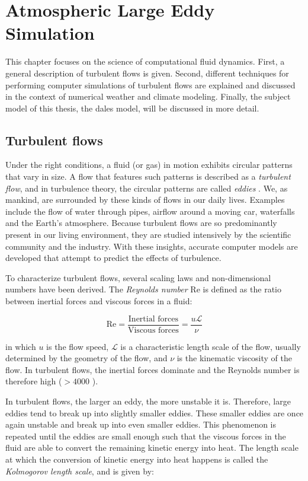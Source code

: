 \chapter{Atmospheric Large Eddy Simulation} \label{chap:les}
This chapter focuses on the science of computational fluid dynamics. First, a general description of turbulent flows is given. Second, different techniques for performing computer simulations of turbulent flows are explained and discussed in the context of numerical weather and climate modeling. Finally, the subject model of this thesis, the \acrfull{dales} model, will be discussed in more detail.

\section{Turbulent flows}
Under the right conditions, a fluid (or gas) in motion exhibits circular patterns that vary in size. A flow that features such patterns is described as a \emph{turbulent flow}, and in turbulence theory, the circular patterns are called \emph{eddies} \citep{popeTurbulentFlows2000}. We, as mankind, are surrounded by these kinds of flows in our daily lives. Examples include the flow of water through pipes, airflow around a moving car, waterfalls and the Earth's atmosphere. Because turbulent flows are so predominantly present in our living environment, they are studied intensively by the scientific community and the industry. With these insights, accurate computer models are developed that attempt to predict the effects of turbulence.

To characterize turbulent flows, several scaling laws and non-dimensional numbers have been derived. The \emph{Reynolds number} $\text{Re}$ is defined as the ratio between inertial forces and viscous forces in a fluid: 

\begin{equation}
    \text{Re} = \frac{\text{Inertial forces}}{\text{Viscous forces}} = \frac{u \mathcal{L}}{\nu}
    \label{eq:reynolds_number}
\end{equation}

in which $u$ is the flow speed, $\mathcal{L}$ is a characteristic length scale of the flow, usually determined by the geometry of the flow, and $\nu$ is the kinematic viscosity of the flow. In turbulent flows, the inertial forces dominate and the Reynolds number is therefore high ($>4000$ \citep{popeTurbulentFlows2000}). 

In turbulent flows, the larger an eddy, the more unstable it is. Therefore, large eddies tend to break up into slightly smaller eddies. These smaller eddies are once again unstable and break up into even smaller eddies. This phenomenon is repeated until the eddies are small enough such that the viscous forces in the fluid are able to convert the remaining kinetic energy into heat. The length scale at which the conversion of kinetic energy into heat happens is called the \emph{Kolmogorov length scale}, and is given by:

